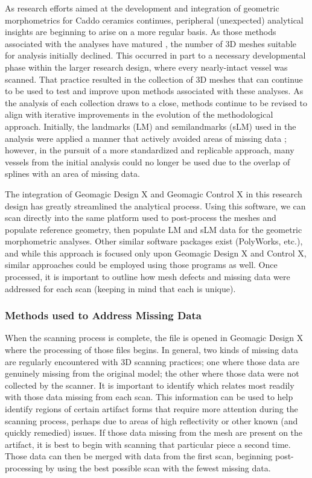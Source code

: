 \documentclass[preprint,12pt]{elsarticle}
\begin{document}
As research efforts aimed at the development and integration of geometric morphometrics for Caddo ceramics continues, peripheral (unexpected) analytical insights are beginning to arise on a more regular basis. As those methods associated with the analyses have matured \citep{Selden:2}, the number of 3D meshes suitable for analysis initially declined. This occurred in part to a necessary developmental phase within the larger research design, where every nearly-intact vessel was scanned. That practice resulted in the collection of 3D meshes that can continue to be used to test and improve upon  methods associated with these analyses. As the analysis of each collection draws to a close, methods continue to be revised to align with iterative improvements in the evolution of the methodological approach. Initially, the landmarks (LM) and semilandmarks (sLM) used in the analysis were applied a manner that actively avoided areas of missing data \citep{Selden:2}; however, in the pursuit of a more standardized and replicable approach, many vessels from the initial analysis could no longer be used due to the overlap of splines with an area of missing data. 

The integration of Geomagic Design X and Geomagic Control X in this research design has greatly streamlined the analytical process. Using this software, we can scan directly into the same platform used to post-process the meshes and populate reference geometry, then populate LM and sLM data for the geometric morphometric analyses. Other similar software packages exist (PolyWorks, etc.), and while this approach is focused only upon Geomagic Design X and Control X, similar approaches could be employed using those programs as well. Once processed, it is important to outline how mesh defects and missing data were addressed for each scan (keeping in mind that each is unique).

\subsubsection{Methods used to Address Missing Data} 

When the scanning process is complete, the file is opened in Geomagic Design X where the processing of those files begins. In general, two kinds of missing data are regularly encountered with 3D scanning practices; one where those data are genuinely missing from the original model; the other where those data were not collected by the scanner. It is important to identify which relates most readily with those data missing from each scan. This information can be used to help identify regions of certain artifact forms that require more attention during the scanning process, perhaps due to areas of high reflectivity or other known (and quickly remedied) issues. If those data missing from the mesh are present on the artifact, it is best to begin with scanning that particular piece a second time. Those data can then be merged with data from the first scan, beginning post-processing by using the best possible scan with the fewest missing data. 
\end{document}
